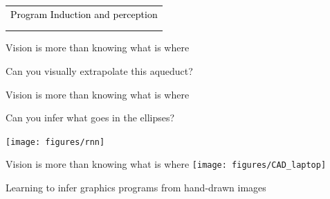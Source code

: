 \documentclass{beamer}
\begin{document}
\begin{frame}{}
  \begin{center}
    \begin{tabular}{l}
      {\textcolor{black}{Program Induction and perception}}\\
      \phantom{Program Induction and }{\textcolor{gray}{model discovery}}\\
      \phantom{Program Induction and }{\textcolor{gray}{learning to learn}}
      \end{tabular}
  \end{center}
\end{frame}

\begin{frame}{Vision is more than knowing what is where}

  Can you visually extrapolate this aqueduct?


\end{frame}

\begin{frame}{Vision is more than knowing what is where}

  Can you infer what goes in the ellipses?

  \vspace{1cm}

  \texttt{[image: figures/rnn]}
\end{frame}

\begin{frame}{Vision is more than knowing what is where}
  \texttt{[image: figures/CAD\_laptop]}
\end{frame}

\begin{frame}[fragile]{Learning to infer graphics programs from hand-drawn images}
\hspace*{-1cm}

\end{frame}
\end{document}
